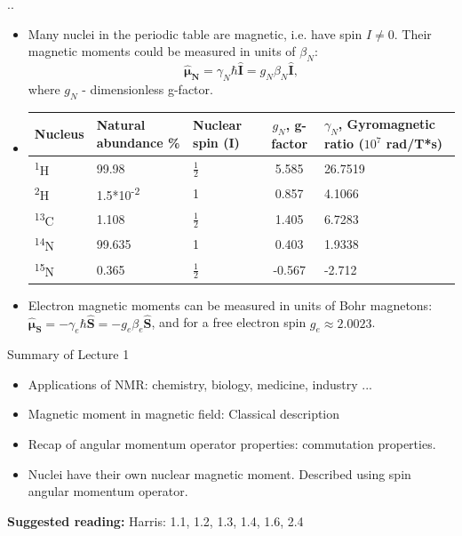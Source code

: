 \documentclass[handout]{beamer}
\begin{document}
\begin{frame}{\thesection.\thesubsection. \insertsubsection}
	\begin{itemize}[<+>]
		\item 	Many nuclei in the periodic table are magnetic, i.e. have spin $I \neq 0$. Their magnetic moments could be measured in units of $\beta_N$:
		\begin{equation}
		\bm{\hat{\mu}_N} = \gamma_N \hbar \bm{\hat{I}} = g_N \beta_N \bm{\hat{I}},
		\end{equation}
		where $g_N$ - dimensionless g-factor.
		\item
\begin{table}[ht]
	\centering
	\begin{tabular}{  C{1.0cm}  C{2.0cm}  C{1.0cm}  C{2.cm}  C{3cm}}
		\hline\hline
		Nucleus & Natural abundance \% & Nuclear spin (I) & $g_N$, g-factor & $\gamma_N$, Gyromagnetic ratio ($10^7$ rad/T*s) \\
		\hline
		\textsuperscript{1}H & 99.98 & $\frac{1}{2}$ & 5.585 & 26.7519 \\
		\textsuperscript{2}H & 1.5*10\textsuperscript{-2} & 1 & 0.857 & 4.1066 \\
		\textsuperscript{13}C & 1.108 & $\frac{1}{2}$ & 1.405 & 6.7283 \\
		\textsuperscript{14}N & 99.635 & 1 & 0.403 & 1.9338 \\
		\textsuperscript{15}N & 0.365 &  $\frac{1}{2}$ & -0.567 & -2.712 \\
		\hline
	\end{tabular}
	\label{tab:mag_properties}		
\end{table}
	\item
    Electron magnetic moments can be measured in units of Bohr magnetons: $\bm{\hat{\mu}_S} = -\gamma_e \hbar \bm{\hat{S}} = -g_e \beta_e \bm{\hat{S}}$, and for a free electron spin $g_e \approx 2.0023$.		
	\end{itemize}
\end{frame}


\begin{frame}{Summary of Lecture 1}
	\begin{itemize}
		\item Applications of NMR: chemistry, biology, medicine, industry ...
		\item Magnetic moment in magnetic field: Classical description 
		\item Recap of angular momentum operator properties: commutation properties.
		\item Nuclei have their own nuclear magnetic moment. Described using spin angular momentum operator.
	\end{itemize}
	\textbf{Suggested reading: } Harris: 1.1, 1.2, 1.3, 1.4, 1.6, 2.4
\end{frame}
\end{document}
